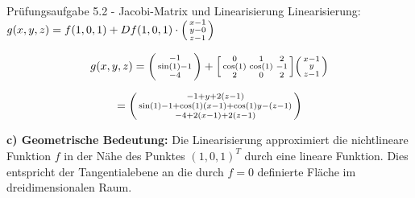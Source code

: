 \begin{example2}{Prüfungsaufgabe 5.2 - Jacobi-Matrix und Linearisierung}
Linearisierung: $g(x, y, z) = f(1, 0, 1) + Df(1, 0, 1) \cdot \begin{psmallmatrix} x - 1 \\ y - 0 \\ z - 1 \end{psmallmatrix}$

$$g(x, y, z) = \begin{psmallmatrix} -1 \\ \sin(1) - 1 \\ -4 \end{psmallmatrix} + \begin{bsmallmatrix} 0 & 1 & 2 \\ \cos(1) & \cos(1) & -1 \\ 2 & 0 & 2 \end{bsmallmatrix} \begin{psmallmatrix} x - 1 \\ y \\ z - 1 \end{psmallmatrix}$$

$$= \begin{psmallmatrix} -1 + y + 2(z-1) \\ \sin(1) - 1 + \cos(1)(x-1) + \cos(1)y - (z-1) \\ -4 + 2(x-1) + 2(z-1) \end{psmallmatrix}$$

\textbf{c) Geometrische Bedeutung:}
Die Linearisierung approximiert die nichtlineare Funktion $f$ in der Nähe des Punktes $(1, 0, 1)^T$ durch eine lineare Funktion. Dies entspricht der Tangentialebene an die durch $f = 0$ definierte Fläche im dreidimensionalen Raum.
\end{example2}



